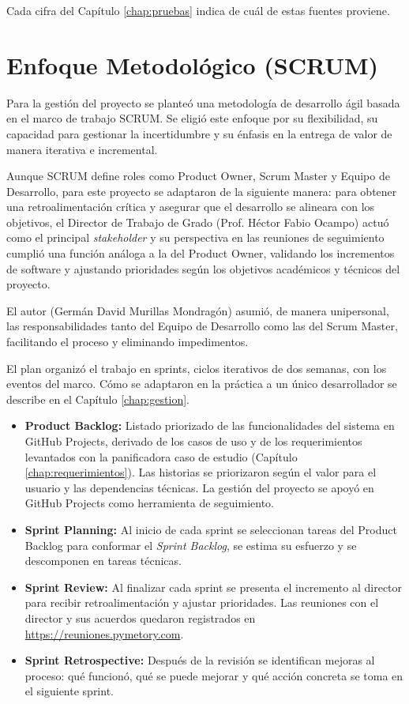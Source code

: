 Cada cifra del Capítulo \ref{chap:pruebas} indica de cuál de estas fuentes proviene.

\section{Enfoque Metodológico (SCRUM)}
\label{sec:scrum}
Para la gestión del proyecto se planteó una metodología de desarrollo ágil basada en el marco de trabajo SCRUM. Se eligió este enfoque por su flexibilidad, su capacidad para gestionar la incertidumbre y su énfasis en la entrega de valor de manera iterativa e incremental.

Aunque SCRUM define roles como Product Owner, Scrum Master y Equipo de Desarrollo, para este proyecto se adaptaron de la siguiente manera: para obtener una retroalimentación crítica y asegurar que el desarrollo se alineara con los objetivos, el Director de Trabajo de Grado (Prof. Héctor Fabio Ocampo) actuó como el principal \textit{stakeholder} y su perspectiva en las reuniones de seguimiento cumplió una función análoga a la del Product Owner, validando los incrementos de software y ajustando prioridades según los objetivos académicos y técnicos del proyecto.

El autor (Germán David Murillas Mondragón) asumió, de manera unipersonal, las responsabilidades tanto del Equipo de Desarrollo como las del Scrum Master, facilitando el proceso y eliminando impedimentos.

El plan organizó el trabajo en sprints, ciclos iterativos de dos semanas, con los eventos del marco. Cómo se adaptaron en la práctica a un único desarrollador se describe en el Capítulo \ref{chap:gestion}.

\begin{itemize}
    \item \textbf{Product Backlog:} Listado priorizado de las funcionalidades del sistema en GitHub Projects, derivado de los casos de uso y de los requerimientos levantados con la panificadora caso de estudio (Capítulo \ref{chap:requerimientos}). Las historias se priorizaron según el valor para el usuario y las dependencias técnicas. La gestión del proyecto se apoyó en GitHub Projects \cite{github_projects} como herramienta de seguimiento.
    
    \item \textbf{Sprint Planning:} Al inicio de cada sprint se seleccionan tareas del Product Backlog para conformar el \textit{Sprint Backlog}, se estima su esfuerzo y se descomponen en tareas técnicas.
    
    \item \textbf{Sprint Review:} Al finalizar cada sprint se presenta el incremento al director para recibir retroalimentación y ajustar prioridades. Las reuniones con el director y sus acuerdos quedaron registrados en \url{https://reuniones.pymetory.com}.
    
    \item \textbf{Sprint Retrospective:} Después de la revisión se identifican mejoras al proceso: qué funcionó, qué se puede mejorar y qué acción concreta se toma en el siguiente sprint.
\end{itemize}

